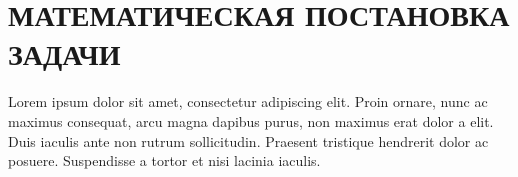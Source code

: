 \newpage
\section{МАТЕМАТИЧЕСКАЯ ПОСТАНОВКА ЗАДАЧИ}

Lorem ipsum dolor sit amet, consectetur adipiscing elit. Proin ornare, nunc ac maximus consequat, arcu magna dapibus
purus, non maximus erat dolor a elit. Duis iaculis ante non rutrum sollicitudin. Praesent tristique hendrerit dolor ac
posuere. Suspendisse a tortor et nisi lacinia iaculis.
